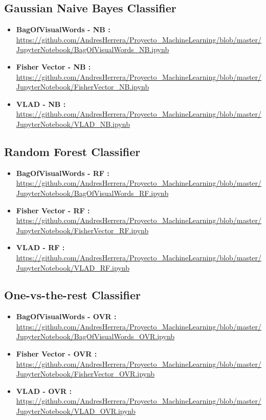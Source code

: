 \documentclass[12pt]{article}
\numberwithin{equation}{section}
\numberwithin{table}{section}
\numberwithin{figure}{section}
\begin{document}
\subsection{Gaussian Naive Bayes Classifier }

\begin{itemize}
	\item {\textbf{BagOfVisualWords - NB :} } \url{https://github.com/AndresHerrera/Proyecto_MachineLearning/blob/master/JupyterNotebook/BagOfVisualWords_NB.ipynb}
	
	\item {\textbf{Fisher Vector - NB :} } \url{	https://github.com/AndresHerrera/Proyecto_MachineLearning/blob/master/JupyterNotebook/FisherVector_NB.ipynb}
	
	\item {\textbf{VLAD - NB :} } \url{	https://github.com/AndresHerrera/Proyecto_MachineLearning/blob/master/JupyterNotebook/VLAD_NB.ipynb}
	
\end{itemize}

\subsection{Random Forest Classifier }

\begin{itemize}
	\item {\textbf{BagOfVisualWords - RF :} } \url{https://github.com/AndresHerrera/Proyecto_MachineLearning/blob/master/JupyterNotebook/BagOfVisualWords_RF.ipynb}
	
	\item {\textbf{Fisher Vector - RF :} } \url{	https://github.com/AndresHerrera/Proyecto_MachineLearning/blob/master/JupyterNotebook/FisherVector_RF.ipynb}
	
	\item {\textbf{VLAD - RF :} } \url{	https://github.com/AndresHerrera/Proyecto_MachineLearning/blob/master/JupyterNotebook/VLAD_RF.ipynb}
	
\end{itemize}


\subsection{One-vs-the-rest Classifier }

\begin{itemize}
	\item {\textbf{BagOfVisualWords - OVR :} } \url{https://github.com/AndresHerrera/Proyecto_MachineLearning/blob/master/JupyterNotebook/BagOfVisualWords_OVR.ipynb}
	
	\item {\textbf{Fisher Vector - OVR :} } \url{	https://github.com/AndresHerrera/Proyecto_MachineLearning/blob/master/JupyterNotebook/FisherVector_OVR.ipynb}
	
	\item {\textbf{VLAD - OVR :} } \url{	https://github.com/AndresHerrera/Proyecto_MachineLearning/blob/master/JupyterNotebook/VLAD_OVR.ipynb}
	
\end{itemize}
\end{document}
